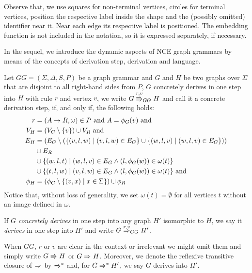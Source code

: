 Observe that, we use squares for non-terminal vertices, circles for terminal vertices, position the respective label inside the shape and the (possibly omitted) identifier near it. Near each edge its respective label is positioned. The embedding function is not included in the notation, so it is expressed separately, if necessary.


In the sequel, we introduce the dynamic aspects of NCE graph grammars by means of the concepts of derivation step, derivation and language.

\begin{definition}
	\label{def:gg_dstep}
	Let $GG = (\Sigma, \Delta, S, P)$ be a graph grammar and $G$ and $H$ be two graphs over $\Sigma$ that are disjoint to all right-hand sides from $P$, $G$ concretely derives in one step into $H$ with rule $r$ and vertex $v$, we write $G \cderiv{r}{v}{GG} H$ and call it a concrete derivation step, if, and only if, the following holds:
	\begin{align*}
		r & = (A \to R, \omega) \in P \text{ and } A = \phi_G(v) \text{ and} \\
		V_H  & = (V_G \setminus \{v\}) \cup V_R \text{ and} \\
		E_H & = (E_G \setminus (\{(v,l,w) \; | \; (v,l,w) \in E_G\} \cup \{(w,l,v) \; | \; (w,l,v) \in E_G\})) \\
		& \cup E_R \\
		& \cup \{(w,l,t) \; | \; (w,l,v) \in E_G \land (l,\phi_G(w)) \in \omega(t)\} \\
		& \cup \{(t,l,w) \; | \; (v,l,w) \in E_G \land (l,\phi_G(w)) \in \omega(t)\} \text{ and} \\
		\phi_H & = (\phi_G \setminus \{(v,x) \; | \; x \in \Sigma \}) \cup \phi_R
	\end{align*}
	Notice that, without loss of generality, we set $\omega(t) = \emptyset$ for all vertices $t$ without an image defined in $\omega$.
	
	If $G$ \textit{concretely derives} in one step into any graph $H'$ isomorphic to $H$, we say it \textit{derives} in one step into $H'$ and write $G \deriv{r}{v}{GG} H'$. 
	
	When $GG$, $r$ or $v$ are clear in the context or irrelevant we might omit them and simply write $G \cderiv{}{}{} H$ or $G \deriv{}{}{} H$. Moreover, we denote the reflexive transitive closure of $\deriv{}{}{}$ by $\Rightarrow^*_{}$ and, for $G \Rightarrow^*_{} H'$, we say $G$ derives into $H'$.
\end{definition}
